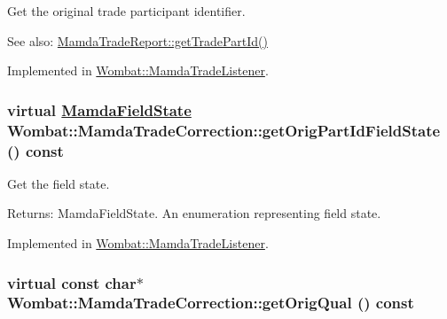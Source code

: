Get the original trade participant identifier. 

\begin{Desc}
\item[See also:]\hyperlink{classWombat_1_1MamdaTradeReport_eb865e0b7c57732356d925d532364c7b}{Mamda\-Trade\-Report::get\-Trade\-Part\-Id()} \end{Desc}


Implemented in \hyperlink{classWombat_1_1MamdaTradeListener_473edf5c6bb8db20a5d2d57f503d7601}{Wombat::Mamda\-Trade\-Listener}.\hypertarget{classWombat_1_1MamdaTradeCorrection_ce8b05826fc7de81ec9597ce8aef8203}{
\subsubsection[getOrigPartIdFieldState]{\setlength{\rightskip}{0pt plus 5cm}virtual \hyperlink{namespaceWombat_93aac974f2ab713554fd12a1fa3b7d2a}{Mamda\-Field\-State} Wombat::Mamda\-Trade\-Correction::get\-Orig\-Part\-Id\-Field\-State () const}}
\label{classWombat_1_1MamdaTradeCorrection_ce8b05826fc7de81ec9597ce8aef8203}


Get the field state. 

\begin{Desc}
\item[Returns:]Mamda\-Field\-State. An enumeration representing field state. \end{Desc}


Implemented in \hyperlink{classWombat_1_1MamdaTradeListener_5e083be5035140d2130f39d19ad79829}{Wombat::Mamda\-Trade\-Listener}.\hypertarget{classWombat_1_1MamdaTradeCorrection_0a9dcb7daee1eb859f9d70020e7ca24e}{
\subsubsection[getOrigQual]{\setlength{\rightskip}{0pt plus 5cm}virtual const char$\ast$ Wombat::Mamda\-Trade\-Correction::get\-Orig\-Qual () const}}
\label{classWombat_1_1MamdaTradeCorrection_0a9dcb7daee1eb859f9d70020e7ca24e}


